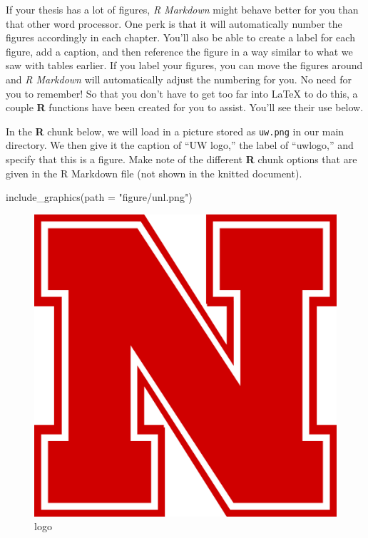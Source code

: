 \documentclass[print]{nuthesis}
\newenvironment{Shaded}{\begin{snugshade}}{\end{snugshade}}
\newcommand{\AttributeTok}[1]{\textcolor[rgb]{0.77,0.63,0.00}{#1}}
\newcommand{\FunctionTok}[1]{\textcolor[rgb]{0.00,0.00,0.00}{#1}}
\newcommand{\NormalTok}[1]{#1}
\newcommand{\StringTok}[1]{\textcolor[rgb]{0.31,0.60,0.02}{#1}}
\begin{document}
If your thesis has a lot of figures, \emph{R Markdown} might behave better for you than that other word processor. One perk is that it will automatically number the figures accordingly in each chapter. You'll also be able to create a label for each figure, add a caption, and then reference the figure in a way similar to what we saw with tables earlier. If you label your figures, you can move the figures around and \emph{R Markdown} will automatically adjust the numbering for you. No need for you to remember! So that you don't have to get too far into LaTeX to do this, a couple \textbf{R} functions have been created for you to assist. You'll see their use below.

In the \textbf{R} chunk below, we will load in a picture stored as \texttt{uw.png} in our main directory. We then give it the caption of ``UW logo,'' the label of ``uwlogo,'' and specify that this is a figure. Make note of the different \textbf{R} chunk options that are given in the R Markdown file (not shown in the knitted document).

\begin{Shaded}
\begin{Highlighting}[]
\FunctionTok{include\_graphics}\NormalTok{(}\AttributeTok{path =} \StringTok{"figure/unl.png"}\NormalTok{)}
\end{Highlighting}
\end{Shaded}

\begin{figure}
\includegraphics[width=\linewidth]{figure/unl} \caption{logo}\label{fig:uwlogo}
\end{figure}
\end{document}
